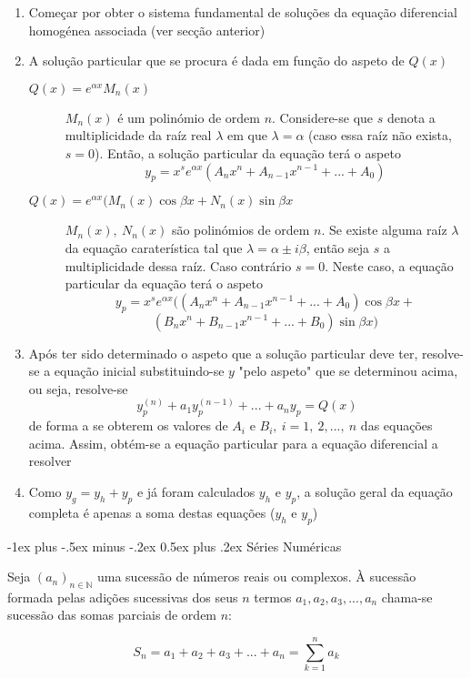 \documentclass[10pt,landscape]{article}
\makeatletter
\renewcommand{\section}{\@startsection{section}{1}{0mm}%
                                {-1ex plus -.5ex minus -.2ex}%
                                {0.5ex plus .2ex}%
                                {\normalfont\large\bfseries}}
\makeatother
\begin{document}
\begin{multicols}{3}
\begin{enumerate}
\item Começar por obter o sistema fundamental de soluções da equação diferencial homogénea associada (ver secção anterior)
\item A solução particular que se procura é dada em função do aspeto de $Q(x)$
\begin{description}
\item[$Q(x) = e^{\alpha x} M_n(x)$] $M_n(x)$ é um polinómio de ordem $n$. Considere-se que $s$ denota a multiplicidade da raíz real $\lambda$ em que $\lambda = \alpha$ (caso essa raíz não exista, $s = 0$). Então, a solução particular da equação terá o aspeto
$$y_p = x^s e^{\alpha x} (A_nx^n + A_{n-1}x^{n-1} + ... + A_0)$$
\item[$Q(x) = e^{\alpha x}(M_n(x)\cos{\beta x} + N_n(x)\sin{\beta x}$] $M_n(x),\ N_n(x)$ são polinómios de ordem $n$. Se existe alguma raíz $\lambda$ da equação caraterística tal que $\lambda = \alpha \pm i\beta$, então seja $s$ a multiplicidade dessa raíz. Caso contrário $s = 0$. Neste caso, a equação particular da equação terá o aspeto
$$y_p = x^s e^{\alpha x}((A_nx^n + A_{n-1}x^{n-1} + ... + A_0)\cos{\beta x} +$$
$$(B_nx^n + B_{n-1}x^{n-1} + ... + B_0)\sin{\beta x})$$
\end{description}
\item Após ter sido determinado o aspeto que a solução particular deve ter, resolve-se a equação inicial substituindo-se $y$ "pelo aspeto" que se determinou acima, ou seja, resolve-se
$$y_p^{(n)} + a_1 y_p^{(n-1)} + ... + a_n y_p = Q(x)$$
de forma a se obterem os valores de $A_i$ e $B_i,\ i = 1,\ 2, ...,\ n$ das equações acima. Assim, obtém-se a equação particular para a equação diferencial a resolver
\item Como $y_g = y_h + y_p$ e já foram calculados $y_h$ e $y_p$, a solução geral da equação completa é apenas a soma destas equações ($y_h$ e $y_p$)
\end{enumerate}

\section{Séries Numéricas}

Seja $(a_n)_{n \in \mathbb{N}}$ uma sucessão de números reais ou complexos. À sucessão formada pelas adições sucessivas dos seus $n$ termos $a_1, a_2, a_3, ..., a_n$ chama-se sucessão das somas parciais de ordem $n$:

$$S_n = a_1 + a_2 + a_3 + ... + a_n = \sum\limits_{k=1}^n a_k$$


\end{multicols}
\end{document}
